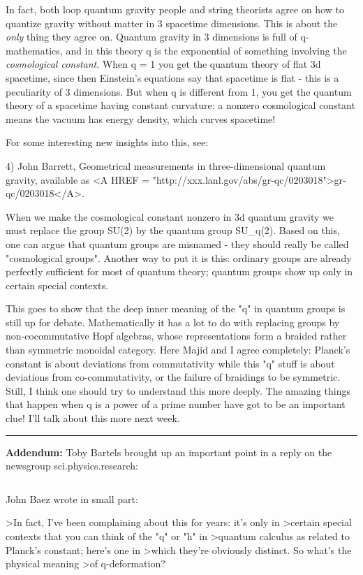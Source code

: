 In fact, both loop quantum gravity people and string theorists agree  
on how to quantize gravity without matter in 3 spacetime dimensions.  
This is about the \emph{only} thing they agree on.  Quantum gravity in 3
dimensions is full of q-mathematics, and in this theory q is the
exponential of something involving the \emph{cosmological constant}.   
When q = 1 you get the quantum theory of flat 3d spacetime, since then
Einstein's equations say that spacetime is flat - this is a peculiarity
of 3 dimensions.  But when q is different from 1, you get the quantum
theory of a spacetime having constant curvature: a nonzero cosmological
constant means the vacuum has energy density, which curves spacetime!  

For some interesting new insights into this, see:

4) John Barrett, Geometrical measurements in three-dimensional
quantum gravity, available as <A HREF = "http://xxx.lanl.gov/abs/gr-qc/0203018">gr-qc/0203018</A>.


When we make the cosmological constant nonzero in 3d quantum gravity we
must replace the group SU(2) by the quantum group SU_{q}(2).  Based on
this, one can argue that quantum groups are misnamed - they should
really be called "cosmological groups".  Another way to put it
is this: ordinary groups are already perfectly sufficient for most of
quantum theory; quantum groups show up only in certain special contexts.

This goes to show that the deep inner meaning of the "q" in
quantum groups is still up for debate.  Mathematically it has a lot to
do with replacing groups by non-cocommutative Hopf algebras, whose
representations form a braided rather than symmetric monoidal category.
Here Majid and I agree completely: Planck's constant is about deviations
from commutativity while this "q" stuff is about deviations
from co-commutativity, or the failure of braidings to be symmetric.
Still, I think one should try to understand this more deeply.  The
amazing things that happen when q is a power of a prime number have got
to be an important clue!  I'll talk about this more next week.


\par\noindent\rule{\textwidth}{0.4pt}
\textbf{Addendum:} Toby Bartels brought up an important point in a reply
on the newsgroup sci.physics.research:


$$

John Baez wrote in small part:

>In fact, I've been complaining about this for years: it's only in
>certain special contexts that you can think of the "q" or "h" in
>quantum calculus as related to Planck's constant; here's one in
>which they're obviously distinct.  So what's the physical meaning
>of q-deformation?

